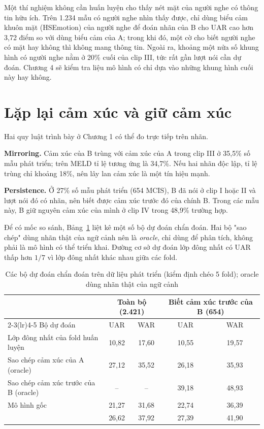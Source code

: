 Một thí nghiệm không cần huấn luyện cho thấy nét mặt của người nghe có thông tin hữu ích. Trên 1.234 mẫu có người nghe nhìn thấy được, chỉ dùng biểu cảm khuôn mặt (HSEmotion) của người nghe để đoán nhãn của B cho UAR cao hơn 3,72 điểm so với dùng biểu cảm của A; trong khi đó, một cờ cho biết người nghe có mặt hay không thì không mang thông tin. Ngoài ra, khoảng một nửa số khung hình có người nghe nằm ở 20\% cuối của clip III, tức rất gần lượt nói cần dự đoán. Chương 4 sẽ kiểm tra liệu mô hình có chỉ dựa vào những khung hình cuối này hay không.

\section{Lặp lại cảm xúc và giữ cảm xúc}

Hai quy luật trình bày ở Chương 1 có thể đo trực tiếp trên nhãn.

\textbf{Mirroring.} Cảm xúc của B trùng với cảm xúc của A trong clip III ở 35,5\% số mẫu phát triển; trên MELD tỉ lệ tương ứng là 34,7\%. Nếu hai nhãn độc lập, tỉ lệ trùng chỉ khoảng 18\%, nên lây lan cảm xúc là một tín hiệu mạnh.

\textbf{Persistence.} Ở 27\% số mẫu phát triển (654 MCIS), B đã nói ở clip I hoặc II và lượt nói đó có nhãn, nên biết được cảm xúc trước đó của chính B. Trong các mẫu này, B giữ nguyên cảm xúc của mình ở clip IV trong 48,9\% trường hợp.

Để có mốc so sánh, Bảng~\ref{tab:copy} liệt kê một số bộ dự đoán chẩn đoán. Hai bộ "sao chép" dùng nhãn thật của ngữ cảnh nên là \emph{oracle}, chỉ dùng để phân tích, không phải là mô hình có thể triển khai. Đường cơ sở dự đoán lớp đông nhất có UAR thấp hơn $1/7$ vì lớp đông nhất khác nhau giữa các fold.

\begin{table}[!htb]
\centering
\caption{Các bộ dự đoán chẩn đoán trên dữ liệu phát triển (kiểm định chéo 5 fold); oracle dùng nhãn thật của ngữ cảnh}
\label{tab:copy}
\begin{tabular}{lcccc}
\toprule
 & \multicolumn{2}{c}{Toàn bộ (2.421)} & \multicolumn{2}{c}{Biết cảm xúc trước của B (654)} \\
\cmidrule(lr){2-3}\cmidrule(lr){4-5}
Bộ dự đoán & UAR & WAR & UAR & WAR \\
\midrule
Lớp đông nhất của fold huấn luyện & 10,82 & 17,60 & 10,55 & 19,57 \\
Sao chép cảm xúc của A (oracle) & 27,12 & 35,52 & 26,18 & 35,93 \\
Sao chép cảm xúc trước của B (oracle) & -- & -- & 39,18 & 48,93 \\
\midrule
Mô hình gốc & 21,27 & 31,68 & 22,74 & 36,39 \\
\model{} & 26,62 & 37,92 & 27,39 & 41,90 \\
\bottomrule
\end{tabular}
\end{table}

